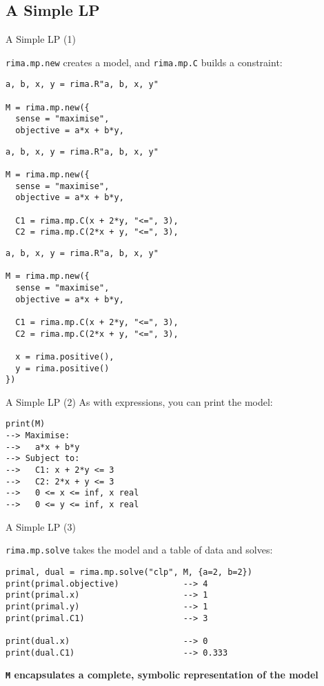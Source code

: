 \documentclass[smaller,handout]{beamer}
\begin{document}
\subsection{A Simple LP}
\begin{frame}[fragile]{A Simple LP (1)}

  \lstinline!rima.mp.new! creates a model, and \lstinline!rima.mp.C! builds a constraint:
  \vspace{-2ex}
  \begin{overprint}
  \begin{lstlisting}
a, b, x, y = rima.R"a, b, x, y"

M = rima.mp.new({
  sense = "maximise",
  objective = a*x + b*y,
  \end{lstlisting}

  \begin{lstlisting}
a, b, x, y = rima.R"a, b, x, y"

M = rima.mp.new({
  sense = "maximise",
  objective = a*x + b*y,

  C1 = rima.mp.C(x + 2*y, "<=", 3),
  C2 = rima.mp.C(2*x + y, "<=", 3),
  \end{lstlisting}

  \begin{lstlisting}
a, b, x, y = rima.R"a, b, x, y"

M = rima.mp.new({
  sense = "maximise",
  objective = a*x + b*y,

  C1 = rima.mp.C(x + 2*y, "<=", 3),
  C2 = rima.mp.C(2*x + y, "<=", 3),

  x = rima.positive(),
  y = rima.positive()
})
  \end{lstlisting}

  \end{overprint}
\end{frame}


\begin{frame}[fragile]{A Simple LP (2)}
  As with expressions, you can print the model:
  \begin{lstlisting}
print(M)
--> Maximise:
-->   a*x + b*y
--> Subject to:
-->   C1: x + 2*y <= 3
-->   C2: 2*x + y <= 3
-->   0 <= x <= inf, x real
-->   0 <= y <= inf, x real
  \end{lstlisting}
\end{frame}


\begin{frame}[fragile]{A Simple LP (3)}

  \lstinline{rima.mp.solve} takes the model and a table of data and solves:
  \begin{lstlisting}
primal, dual = rima.mp.solve("clp", M, {a=2, b=2})
print(primal.objective)             --> 4
print(primal.x)                     --> 1
print(primal.y)                     --> 1
print(primal.C1)                    --> 3

print(dual.x)                       --> 0
print(dual.C1)                      --> 0.333
  \end{lstlisting}
  \bf{\lstinline{M} encapsulates a complete, symbolic representation of the model}
\end{frame}
\end{document}
